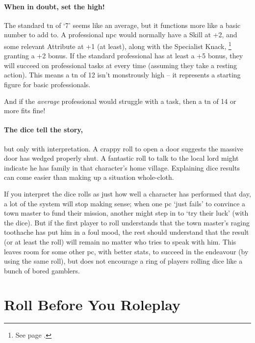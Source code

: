 \begin{multicols}{2}
\paragraph{When in doubt, set the  high!}
The standard \gls{tn} of `7' seems like an average, but it functions more like a basic number to add to.
A professional \gls{npc} would normally have a Skill at +2, and some relevant Attribute at +1 (at least), along with the Specialist Knack,%
\footnote{See page \pageref{specialist}.}
granting a +2 bonus.
If the standard professional has at least a +5 bonus, they will succeed on professional tasks at  every time (assuming they take a resting action).
This means a \gls{tn} of 12 isn't monstrously high -- it represents a starting figure for basic professionals.

And if the \emph{average} professional would struggle with a task, then a \gls{tn} of 14 or more fits fine!

\paragraph{The dice tell the story,} but only with interpretation.
A crappy roll to open a door suggests the massive door has wedged properly shut.
A fantastic roll to talk to the local lord might indicate he has family in that character's home village.
Explaining dice results can come easier than making up a situation whole-cloth.

If you interpret the dice rolls as just how well a character has performed that day, a lot of the system will stop making sense; when one \gls{pc} `just fails' to convince a town master to fund their mission, another might step in to `try their luck' (with the dice).
But if the first player to roll understands that the town master's raging toothache has put him in a foul mood, the rest should understand that the result (or at least the roll) will remain no matter who tries to speak with him.
This leaves room for some other \gls{pc}, with better stats, to succeed in the endeavour (by using the same roll), but does not encourage a ring of players rolling dice like a bunch of bored gamblers.

\end{multicols}

\section[Social Rolls]{Roll Before You Roleplay}

